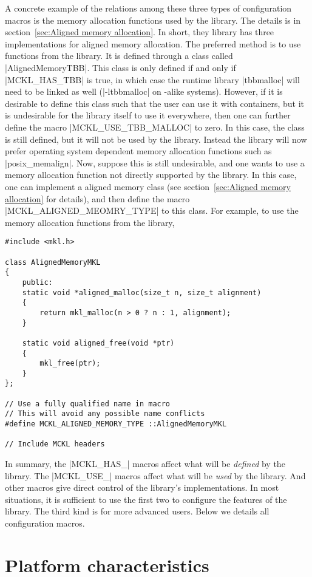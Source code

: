 A concrete example of the relations among these three types of configuration
macros is the memory allocation functions used by the library. The details is
in section~\ref{sec:Aligned memory allocation}. In short, they library has
three implementations for aligned memory allocation. The preferred method is to
use functions from the \tbb library. It is defined through a class called
|AlignedMemoryTBB|. This class is only defined if and only if |MCKL_HAS_TBB| is
true, in which case the runtime library |tbbmalloc| will need to be linked as
well (|-ltbbmalloc| on \unix-alike systems). However, if it is desirable to
define this class such that the user can use it with \stl containers, but it is
undesirable for the library itself to use it everywhere, then one can further
define the macro |MCKL_USE_TBB_MALLOC| to zero. In this case, the class is
still defined, but it will not be used by the library. Instead the library will
now prefer operating system dependent memory allocation functions such as
|posix_memalign|. Now, suppose this is still undesirable, and one wants to use
a memory allocation function not directly supported by the library. In this
case, one can implement a aligned memory class (see section~\ref{sec:Aligned
memory allocation} for details), and then define the macro
|MCKL_ALIGNED_MEOMRY_TYPE| to this class. For example, to use the memory
allocation functions from the \mkl library,
\begin{verbatim}
#include <mkl.h>

class AlignedMemoryMKL
{
    public:
    static void *aligned_malloc(size_t n, size_t alignment)
    {
        return mkl_malloc(n > 0 ? n : 1, alignment);
    }

    static void aligned_free(void *ptr)
    {
        mkl_free(ptr);
    }
};

// Use a fully qualified name in macro
// This will avoid any possible name conflicts
#define MCKL_ALIGNED_MEMORY_TYPE ::AlignedMemoryMKL

// Include MCKL headers
\end{verbatim}
In summary, the |MCKL_HAS_| macros affect what will be \emph{defined} by the
library. The |MCKL_USE_| macros affect what will be \emph{used} by the library.
And other macros give direct control of the library's implementations. In most
situations, it is sufficient to use the first two to configure the features of
the library. The third kind is for more advanced users. Below we details all
configuration macros.

\section{Platform characteristics}
\label{sec:Platform characteristics}

